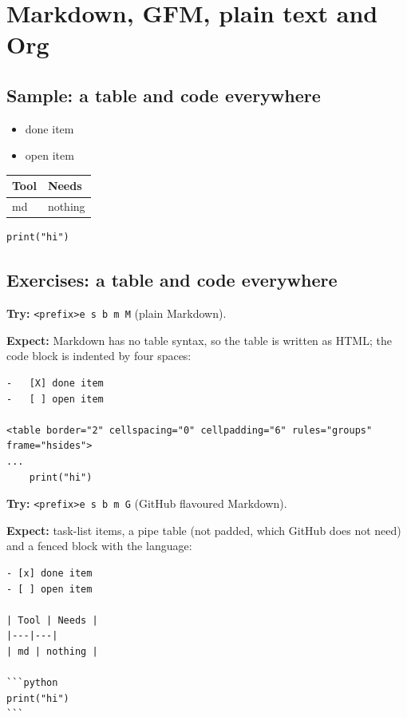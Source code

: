 \section{Markdown, GFM, plain text and Org}
\label{sec:org670b432}
\subsection{Sample: a table and code everywhere}
\label{sec:org957d6c4}
\begin{itemize}
\item[{$\boxtimes$}] done item
\item[{$\square$}] open item
\end{itemize}

\begin{center}
\begin{tabular}{ll}
Tool & Needs\\
\hline
md & nothing\\
\end{tabular}
\end{center}

\begin{verbatim}
print("hi")
\end{verbatim}
\subsection{Exercises: a table and code everywhere}
\label{sec:org91befa8}
\textbf{Try:} \texttt{<prefix>e s b m M} (plain Markdown).

\textbf{Expect:} Markdown has no table syntax, so the table is written as HTML;
the code block is indented by four spaces:

\begin{verbatim}
-   [X] done item
-   [ ] open item

<table border="2" cellspacing="0" cellpadding="6" rules="groups" frame="hsides">
...
    print("hi")
\end{verbatim}

\textbf{Try:} \texttt{<prefix>e s b m G} (GitHub flavoured Markdown).

\textbf{Expect:} task-list items, a pipe table (not padded, which GitHub does
not need) and a fenced block with the language:

\begin{verbatim}
- [x] done item
- [ ] open item

| Tool | Needs |
|---|---|
| md | nothing |

```python
print("hi")
```
\end{verbatim}


